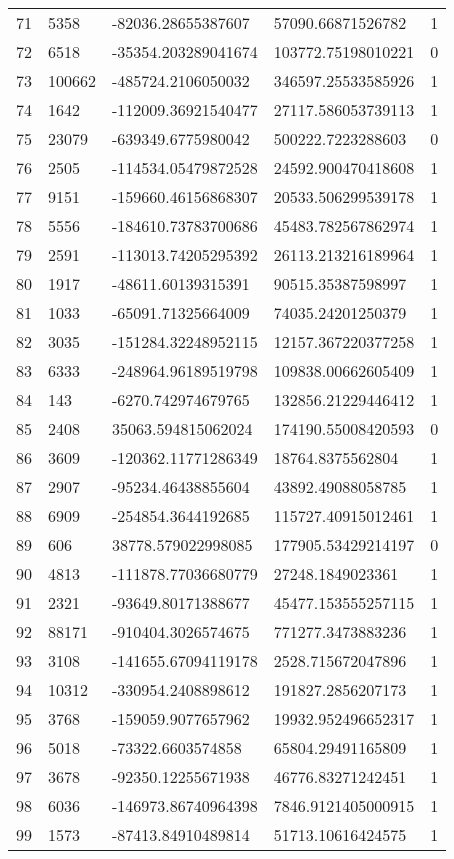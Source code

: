 \begin{longtable}{lllll}
    71 & 5358 & -82036.28655387607 & 57090.66871526782 & 1 \\
    72 & 6518 & -35354.203289041674 & 103772.75198010221 & 0 \\
    73 & 100662 & -485724.2106050032 & 346597.25533585926 & 1 \\
    74 & 1642 & -112009.36921540477 & 27117.586053739113 & 1 \\
    75 & 23079 & -639349.6775980042 & 500222.7223288603 & 0 \\
    76 & 2505 & -114534.05479872528 & 24592.900470418608 & 1 \\
    77 & 9151 & -159660.46156868307 & 20533.506299539178 & 1 \\
    78 & 5556 & -184610.73783700686 & 45483.782567862974 & 1 \\
    79 & 2591 & -113013.74205295392 & 26113.213216189964 & 1 \\
    80 & 1917 & -48611.60139315391 & 90515.35387598997 & 1 \\
    81 & 1033 & -65091.71325664009 & 74035.24201250379 & 1 \\
    82 & 3035 & -151284.32248952115 & 12157.367220377258 & 1 \\
    83 & 6333 & -248964.96189519798 & 109838.00662605409 & 1 \\
    84 & 143 & -6270.742974679765 & 132856.21229446412 & 1 \\
    85 & 2408 & 35063.594815062024 & 174190.55008420593 & 0 \\
    86 & 3609 & -120362.11771286349 & 18764.8375562804 & 1 \\
    87 & 2907 & -95234.46438855604 & 43892.49088058785 & 1 \\
    88 & 6909 & -254854.3644192685 & 115727.40915012461 & 1 \\
    89 & 606 & 38778.579022998085 & 177905.53429214197 & 0 \\
    90 & 4813 & -111878.77036680779 & 27248.1849023361 & 1 \\
    91 & 2321 & -93649.80171388677 & 45477.153555257115 & 1 \\
    92 & 88171 & -910404.3026574675 & 771277.3473883236 & 1 \\
    93 & 3108 & -141655.67094119178 & 2528.715672047896 & 1 \\
    94 & 10312 & -330954.2408898612 & 191827.2856207173 & 1 \\
    95 & 3768 & -159059.9077657962 & 19932.952496652317 & 1 \\
    96 & 5018 & -73322.6603574858 & 65804.29491165809 & 1 \\
    97 & 3678 & -92350.12255671938 & 46776.83271242451 & 1 \\
    98 & 6036 & -146973.86740964398 & 7846.9121405000915 & 1 \\
    99 & 1573 & -87413.84910489814 & 51713.10616424575 & 1
\end{longtable}